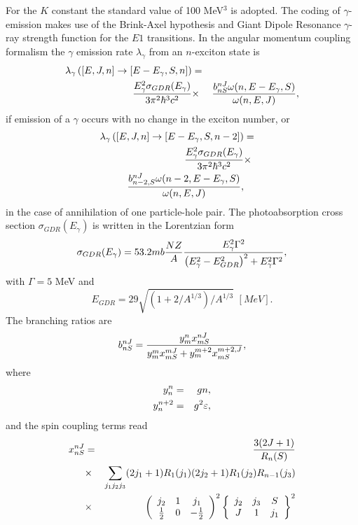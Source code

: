 For the $K$ constant the standard value of 100 MeV$^{3}$ is adopted. The
coding of $\gamma$-emission makes use of the Brink-Axel hypothesis \cite%
{Axel,Brink,Brinka} and Giant Dipole Resonance $\gamma$-ray strength
function for the $E1$ transitions. In the angular momentum coupling
formalism the $\gamma$ emission rate $\lambda_{\gamma}$ from an $n$-exciton
state is 
\begin{eqnarray}
\lambda_{\gamma}\left(\left[E,J,n\right]\rightarrow\left[E-E_{\gamma},S,n%
\right]\right)&=& \\
\frac{E_{\gamma}^{2}\sigma_{GDR}(E_{\gamma})}{3\pi^{2}\hbar^{3}c^{2}}&\times&%
\frac{b_{nS}^{nJ}\omega(n,E-E_{\gamma},S)}{\omega(n,E,J)} ,  \notag
\end{eqnarray}
if emission of a $\gamma$ occurs with no change in the exciton number, or 
\begin{eqnarray}
\lambda_{\gamma}\left(\left[E,J,n\right]\rightarrow\left[E-E_{\gamma},S,n-2%
\right]\right)&=&  \notag \\
\frac{E_{\gamma}^{2}\sigma_{GDR}(E_{\gamma})}{3\pi^{2}\hbar^{3}c^{2}}&\times&
\notag \\
\frac{b_{n-2,S}^{nJ}\omega(n-2,E-E_{\gamma},S)}{\omega(n,E,J)},&&
\end{eqnarray}
in the case of annihilation of one particle-hole pair. The photoabsorption
cross section $\sigma_{GDR}(E_{\gamma})$ is written in the Lorentzian form 
\begin{equation}
\sigma_{GDR}(E_{\gamma})=53.2mb\frac{NZ}{A}\frac{E_{\gamma}^{2}\Gamma^{2}}{%
\left(E_{\gamma}^{2}-E_{GDR}^{2}\right)^{2}+E_{\gamma}^{2}\Gamma^{2}},
\end{equation}
with $\Gamma=5$ MeV and 
\begin{equation}
E_{GDR}=29\sqrt{\left(1+2/A^{1/3}\right)/A^{1/3}}\,\,[MeV].
\end{equation}
The branching ratios are 
\begin{equation}
b_{nS}^{nJ}=\frac{y_{m}^{n}x_{mS}^{nJ}}{%
y_{m}^{m}x_{mS}^{mJ}+y_{m}^{m+2}x_{mS}^{m+2,J}},
\end{equation}
\noindent where 
\begin{eqnarray}
y_{n}^{n} & = & gn,  \notag \\
y_{n}^{n+2} & = & g^{2}\varepsilon,
\end{eqnarray}
and the spin coupling terms read 
\begin{eqnarray}
x_{nS}^{nJ} & = & \frac{3(2J+1)}{R_{n}(S)}  \notag \\
& \times
&\sum_{j_{1}j_{2}j_{3}}(2j_{1}+1)R_{1}(j_{1})(2j_{2}+1)R_{1}(j_{2})R_{n-1}(j_{3})
\notag \\
& \times & \left(%
\begin{array}{ccc}
j_{2} & 1 & j_{1} \\ 
\frac{1}{2} & 0 & -\frac{1}{2}%
\end{array}%
\right)^{2}\left\{ 
\begin{array}{ccc}
j_{2} & j_{3} & S \\ 
J & 1 & j_{1}%
\end{array}%
\right\} ^{2}
\end{eqnarray}
